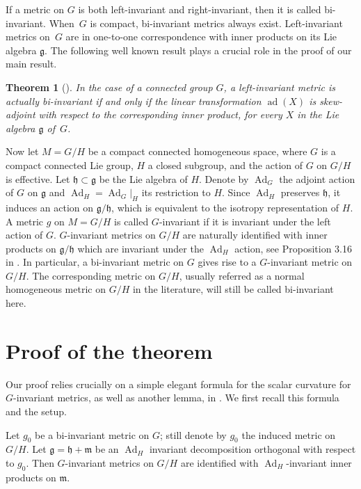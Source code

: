 \documentclass[pdftex]{sigma}
\newtheorem{Theorem}{Theorem}
\begin{document}
If a metric on $G$ is both left-invariant and right-invariant, then it is called bi-invariant. When~$G$ is compact, bi-invariant metrics always exist. Left-invariant metrics on~$G$ are in one-to-one correspondence with inner products on its Lie algebra $\mathfrak{g}$. The following well known result plays a crucial role in the proof of our main result.

\begin{Theorem}[{\cite[Lemma~7.2]{1}}]\label{theorem2}
	In the case of a connected group $G$, a left-invariant metric is actually bi-invariant if and only if the linear transformation
	$\operatorname{ad}(X)$ is skew-adjoint with respect to the corresponding inner product, for every $X$ in the Lie algebra $\mathfrak{g}$ of~$G$.
\end{Theorem}

Now let $M=G/H$ be a compact connected homogeneous space, where $G$ is a compact connected Lie group, $H$ a closed subgroup, and the action of $G$ on $G/H$
is effective.
Let $\mathfrak{h}\subset \mathfrak{g}$ be the Lie algebra of $H$. Denote by $\operatorname{Ad}_G$ the adjoint action of $G$ on $\mathfrak{g}$ and $\operatorname{Ad}_H=\operatorname{Ad}_G|_H$ its restriction to $H$. Since $\operatorname{Ad}_H$ preserves $\mathfrak{h}$, it induces an action on $\mathfrak{g}/\mathfrak{h}$, which is equivalent to the isotropy representation of $H$.
A metric $g$ on $M=G/H$ is called $G$-invariant if it is invariant under the left action of $G$. $G$-invariant metrics on $G/H$ are naturally identified with inner products on $\mathfrak{g}/\mathfrak{h}$ which are invariant under the $\operatorname{Ad}_H$ action, see Proposition 3.16 in \cite{13}. In particular, a bi-invariant metric on $G$ gives rise to a $G$-invariant metric on $G/H$. The corresponding metric on $G/H$, usually
referred as a normal homogeneous metric on $G/H$ in the literature, will still be called bi-invariant here.


\section{Proof of the theorem}

Our proof relies crucially on a simple elegant formula for the scalar curvature for $G$-invariant metrics, as well as another lemma, in \cite{12}. We first recall this formula and the setup.

Let $g_0$ be a bi-invariant metric on $G$; still denote by $g_0$ the induced metric on $G/H$. Let $\mathfrak{g}=\mathfrak{h} + \mathfrak{m}$ be an $\operatorname{Ad}_H$ invariant decomposition orthogonal with respect to $g_0$. Then $G$-invariant metrics on $G/H$ are identified with $\operatorname{Ad}_H$-invariant inner products on $\mathfrak{m}$.
\end{document}
